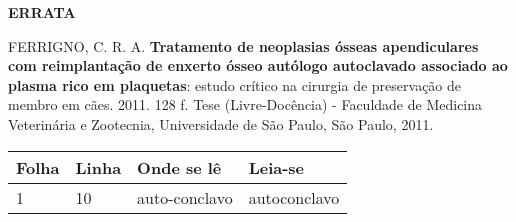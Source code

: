 \thispagestyle{empty}
\begin{center} \textbf{ERRATA} \end{center}

\vspace{1 cm}

\hspace{0.5 cm} FERRIGNO, C. R. A. \textbf{Tratamento de neoplasias ósseas apendiculares com
    reimplantação de enxerto ósseo autólogo autoclavado associado ao plasma
    rico em plaquetas}: estudo crítico na cirurgia de preservação de membro em
cães. 2011. 128 f. Tese (Livre-Docência) - Faculdade de Medicina Veterinária e
Zootecnia, Universidade de São Paulo, São Paulo, 2011.

\begin{table}[htb]
    \center
    \footnotesize
    \begin{tabular}{|p{1.4cm}|p{1cm}|p{3cm}|p{3cm}|}
        \hline
        \textbf{Folha} & \textbf{Linha} & \textbf{Onde se lê} & \textbf{Leia-se} \\
        \hline
        1              & 10             & auto-conclavo       & autoconclavo     \\
        \hline
    \end{tabular}
\end{table}